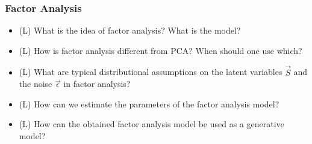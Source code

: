 \subsubsection*{Factor Analysis}
\begin{itemize}
    \item (L) What is the idea of factor analysis? What is the model?
    \item (L) How is factor analysis different from PCA? When should one use which?
    \item (L) What are typical distributional assumptions on the latent variables $\vec{S}$ and 
    the noise $\vec{\epsilon}$ in factor analysis?
    \item (L) How can we estimate the parameters of the factor analysis model?
    \item (L) How can the obtained factor analysis model be used as a generative model?
\end{itemize}

